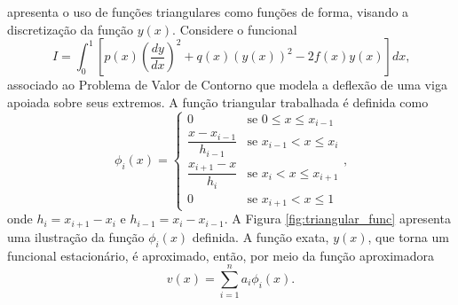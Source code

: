 \documentclass[
	12pt,				%
	openright,			%
    twoside,			%
	a4paper,			%
	english,			%
	french,				%
	spanish,			%
	brazil				%
	]{abntex2}
\numberwithin{lema}{chapter}
\numberwithin{teorema}{chapter}
\numberwithin{definicao}{chapter}
\numberwithin{exemplo}{chapter}
\numberwithin{figure}{chapter}
\begin{document}
 apresenta o uso de funções triangulares como funções de forma, visando a discretização da função $y(x)$. Considere o funcional
\begin{equation}
	\label{eqn:cap_metodo_ray_ritz:tri_func_funcional}
	I = \int_{0}^{1} \left [ 
		p(x) \left ( 
			\frac{dy}{dx}
		\right )^2
		+ q(x)(y(x))^2 
		- 2f(x)y(x) 
	\right ] dx
	\text{,}
\end{equation}
associado ao Problema de Valor de Contorno que modela a deflexão de uma viga apoiada sobre seus extremos. A função triangular trabalhada é definida como
\begin{equation}
	\label{eqn:cap_metodo_ray_ritz:tri_func_phi}
	\phi_i (x) = 
		\begin{cases}
			0 							& \mbox{se } 0 \leqslant x \leqslant x_{i - 1}\\[5pt]
			\dfrac{x-x_{i-1}}{h_{i-1}} 	& \mbox{se } x_{i-1} < x \leqslant x_i\\[10pt]
			\dfrac{x_{i+1}-x}{h_i}		& \mbox{se } x_i < x \leqslant x_{i+1}\\[5pt]
			0							& \mbox{se } x_{i+1}<x\leqslant 1
		\end{cases}
	\text{,}
\end{equation}
onde $h_i = x_{i+1}-x_{i}$ e $h_{i-1}=x_i-x_{i-1}$. A Figura \ref{fig:triangular_func} apresenta uma ilustração da função $\phi_i(x)$ definida. A função exata, $y(x)$, que torna um funcional estacionário, é aproximado, então, por meio da função aproximadora
\begin{equation}
	\label{eqn:cap_metodo_ray_ritz:tri_func_app_v}
	v(x)=\sum_{i=1}^{n} a_i \phi_i(x)
	\text{.}
\end{equation}
\end{document}
